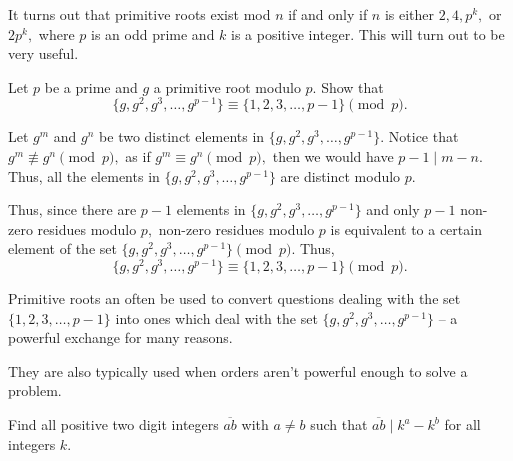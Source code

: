 \documentclass[blue,onecol]{shooting}
\begin{document}
It turns out that primitive roots exist mod $n$ if and only if $n$ is either $2, 4, p^k,$ or $2p^k,$ where $p$ is an odd prime and $k$ is a positive integer. This will turn out to be very useful.

\begin{fact}
Let $p$ be a prime and $g$ a primitive root modulo $p.$ Show that $$\{g, g^2, g^3, \dots, g^{p-1}\} \equiv \{1, 2, 3, \dots, p-1 \} \pmod{p}.$$
\end{fact}

\begin{pro}
Let $g^m$ and $g^n$ be two distinct elements in $\{g, g^2, g^3, \dots, g^{p-1}\}.$ Notice that $g^m \not\equiv g^n \pmod{p},$ as if $g^m \equiv g^n \pmod{p},$ then we would have $p-1 \mid m-n.$ Thus, all the elements in $\{g, g^2, g^3, \dots, g^{p-1}\}$ are distinct modulo $p.$

Thus, since there are $p-1$ elements in $\{g, g^2, g^3, \dots, g^{p-1}\}$ and only $p-1$ non-zero residues modulo $p,$ non-zero residues modulo $p$ is equivalent to a certain element of the set $\{g, g^2, g^3, \dots, g^{p-1}\} \pmod{p}.$ Thus, $$\{g, g^2, g^3, \dots, g^{p-1}\} \equiv \{1, 2, 3, \dots, p-1 \} \pmod{p}.$$
\end{pro}

Primitive roots an often be used to convert questions dealing with the set $\{1, 2, 3, \dots, p-1 \}$ into ones which deal with the set $\{g, g^2, g^3, \dots, g^{p-1}\}$ -- a powerful exchange for many reasons. 

They are also typically used when orders aren't powerful enough to solve a problem.

\begin{exam}
Find all positive two digit integers $\overline{ab}$ with $a \neq b$ such that $\overline{ab} \mid k^a-k^b$ for all integers $k.$ 
\end{exam}
\end{document}
